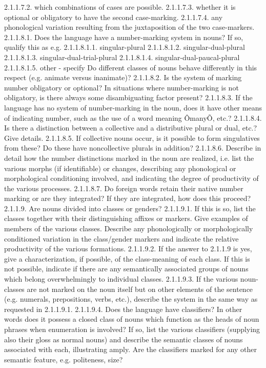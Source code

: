 2.1.1.7.2. which combinations of cases are possible.
2.1.1.7.3. whether it is optional or obligatory to have the second case-marking.
2.1.1.7.4. any phonological variation resulting from the juxtaposition of the two case-markers.
2.1.1.8.1. Does the language have a number-marking system in nouns? If so, qualify this as e.g.
2.1.1.8.1.1. singular-plural
2.1.1.8.1.2. singular-dual-plural
2.1.1.8.1.3. singular-dual-trial-plural
2.1.1.8.1.4. singular-dual-paucal-plural
2.1.1.8.1.5. other - specify
Do different classes of nouns behave differently in this respect (e.g. animate versus inanimate)?
2.1.1.8.2. Is the system of marking number obligatory or optional? In situations where number-marking is not obligatory, is there always some disambiguating factor present?
2.1.1.8.3. If the language has no system of number-marking in the noun, does it have other means of indicating number, such as the use of a word meaning ÔmanyÕ, etc.?
2.1.1.8.4. Is there a distinction between a collective and a distributive plural or dual, etc.? Give details.
2.1.1.8.5. If collective nouns occur, is it possible to form singulatives from these? Do these have noncollective plurals in addition?
2.1.1.8.6. Describe in detail how the number distinctions marked in the noun are realized, i.e. list the various morphs (if identifiable) or changes, describing any phonological or morphological conditioning involved, and indicating the degree of productivity of the various processes.
2.1.1.8.7. Do foreign words retain their native number marking or are they integrated? If they are integrated, how does this proceed?
2.1.1.9. Are nouns divided into classes or genders?
2.1.1.9.1. If this is so, list the classes together with their distinguishing affixes or markers. Give examples of members of the various classes. Describe any phonologically or morphologically conditioned variation in the class/gender markers and indicate the relative productivity of the various formations.
2.1.1.9.2. If the answer to 2.1.1.9 is yes, give a characterization, if possible, of the class-meaning of each class. If this is not possible, indicate if there are any semantically associated groups of nouns which belong overwhelmingly to individual classes.
2.1.1.9.3. If the various noun-classes are not marked on the noun itself but on other elements of the sentence (e.g. numerals, prepositions, verbs, etc.), describe the system in the same way as requested in 2.1.1.9.1.
2.1.1.9.4. Does the language have classifiers?
In other words does it possess a closed class of nouns which function as the heads of noun phrases when enumeration is involved? If so, list the various classifiers (supplying also their gloss as normal nouns) and describe the semantic classes of nouns associated with each, illustrating amply. Are the classifiers marked for any other semantic feature, e.g. politeness, size?
